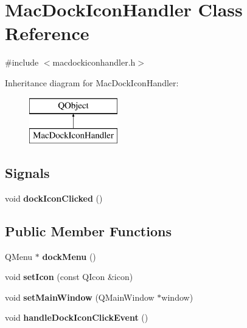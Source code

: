 \hypertarget{class_mac_dock_icon_handler}{}\section{Mac\+Dock\+Icon\+Handler Class Reference}
\label{class_mac_dock_icon_handler}


{\ttfamily \#include $<$macdockiconhandler.\+h$>$}

Inheritance diagram for Mac\+Dock\+Icon\+Handler\+:\begin{figure}[H]
\begin{center}
\leavevmode
\includegraphics[height=2.000000cm]{class_mac_dock_icon_handler}
\end{center}
\end{figure}
\subsection*{Signals}
\begin{DoxyCompactItemize}
\item 
\mbox{\label{class_mac_dock_icon_handler_ae75bf0cda7a9c1a8fbc24af59b9f0e0f}} 
void {\bfseries dock\+Icon\+Clicked} ()
\end{DoxyCompactItemize}
\subsection*{Public Member Functions}
\begin{DoxyCompactItemize}
\item 
\mbox{\label{class_mac_dock_icon_handler_a8aff3dc6410687e432f8d9314eba0ab9}} 
Q\+Menu $\ast$ {\bfseries dock\+Menu} ()
\item 
\mbox{\label{class_mac_dock_icon_handler_a537f8eb3c9752089e3e2e0e30011a65b}} 
void {\bfseries set\+Icon} (const Q\+Icon \&icon)
\item 
\mbox{\label{class_mac_dock_icon_handler_a4d2d18c7d56286ea745e349497941293}} 
void {\bfseries set\+Main\+Window} (Q\+Main\+Window $\ast$window)
\item 
\mbox{\label{class_mac_dock_icon_handler_a38f422d9dde7df4ccfdda97b08467e0a}} 
void {\bfseries handle\+Dock\+Icon\+Click\+Event} ()
\end{DoxyCompactItemize}
